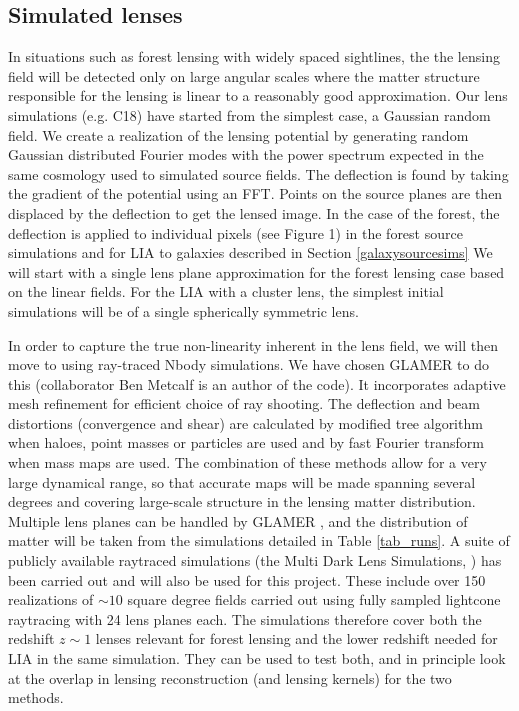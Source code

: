 \subsection{Simulated lenses}
In situations such as forest lensing with widely spaced sightlines,
the 
the lensing field will be detected only on large angular scales 
where the matter structure responsible for the lensing is linear to a
reasonably good approximation. Our lens simulations (e.g. C18)
have started from the simplest case, a Gaussian random field.   
We create a realization of the lensing potential by generating random 
Gaussian  distributed Fourier modes with the power spectrum expected 
in the same cosmology
 used to simulated source fields.   The deflection is found by taking the 
gradient of the potential using an FFT.  Points on the source planes 
are then displaced by the deflection to get the lensed image. 
In the case of the forest, the deflection is applied to individual pixels
(see Figure 1) in the forest source simulations
 and for LIA to galaxies described in Section \ref{galaxysourcesims}
We will start with a single lens plane approximation for the forest lensing
case based on the linear fields. For the LIA with a cluster lens, the 
simplest initial simulations will be of a single spherically  symmetric lens.

In order to capture the true non-linearity inherent in the lens field,
 we will then move to using ray-traced  Nbody simulations. We have chosen  
GLAMER   \cite{metcalf2014} to do this (collaborator Ben Metcalf is an 
author of the code). It incorporates adaptive mesh refinement for
efficient choice of ray shooting. The deflection and beam distortions 
(convergence and shear) are calculated by modified tree algorithm when haloes,
 point masses or particles are used and by fast Fourier transform when 
mass maps are used. The combination of these methods allow for a very 
large dynamical range, so that accurate  maps will be made
spanning several degrees and covering large-scale
structure in the lensing matter distribution. Multiple lens planes can be
handled by GLAMER \cite{petkova2014}, and the distribution of matter
will be taken from the simulations detailed in Table \ref{tab_runs}. A suite 
of publicly available raytraced simulations (the Multi Dark Lens Simulations,
\cite{giocoli2016}) has been carried out and will also be used for 
this project. These include over 150 realizations of $\sim 10$ square
degree fields carried out using fully sampled lightcone raytracing
with 24 lens planes each. The simulations therefore cover both the
redshift $z\sim1$ lenses relevant for forest lensing and the lower 
redshift needed for LIA in the same simulation. They can be used to
test both, and in principle look at the overlap in lensing reconstruction
(and lensing kernels) for the two methods. 


